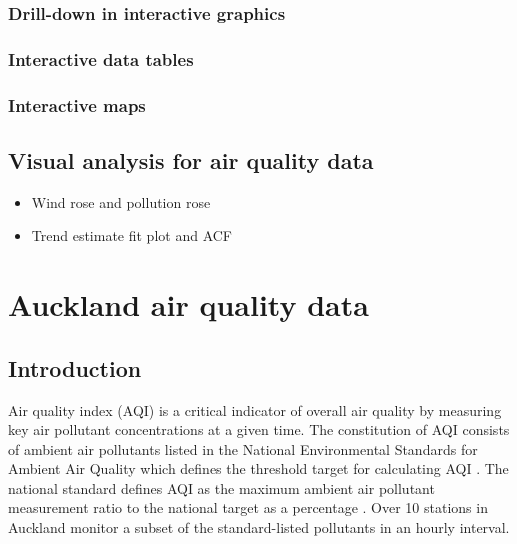 \documentclass{aucklandthesis}
\begin{document}
\hypertarget{sec:drill-down}{%
\subsection{Drill-down in interactive graphics}\label{sec:drill-down}}

\hypertarget{sec:html-table}{%
\subsection{Interactive data tables}\label{sec:html-table}}

\hypertarget{interactive-maps}{%
\subsection{Interactive maps}\label{interactive-maps}}

\hypertarget{visual-analysis-for-air-quality-data}{%
\section{Visual analysis for air quality data}\label{visual-analysis-for-air-quality-data}}

\begin{itemize}
\tightlist
\item
  Wind rose and pollution rose
\item
  Trend estimate fit plot and ACF
\end{itemize}

\hypertarget{ch:data}{%
\chapter{Auckland air quality data}\label{ch:data}}

\hypertarget{introduction}{%
\section{Introduction}\label{introduction}}

Air quality index (AQI) is a critical indicator of overall air quality by measuring key air pollutant concentrations at a given time. The constitution of AQI consists of ambient air pollutants listed in the National Environmental Standards for Ambient Air Quality which defines the threshold target for calculating AQI \autocite{aqi}. The national standard defines AQI as the maximum ambient air pollutant measurement ratio to the national target as a percentage \autocite{aqitarget}. Over 10 stations in Auckland monitor a subset of the standard-listed pollutants in an hourly interval.
\end{document}
